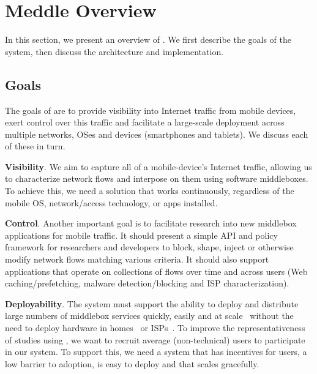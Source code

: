 \section{Meddle Overview}
\label{sec:goals}

In this section, we present an overview of \meddle. We first describe the goals of the 
system, then discuss the \meddle architecture and implementation. 


\subsection{Goals}

The goals of \meddle are to provide visibility into Internet traffic from mobile devices, 
exert control over this traffic and facilitate a large-scale deployment across multiple 
networks, OSes and devices (smartphones and tablets). We discuss each of these in turn.

\noindent\textbf{Visibility}. We aim to capture all of a mobile-device's Internet traffic,
allowing us to characterize network flows and interpose on them using software middleboxes. 
To achieve this, we need a solution that works continuously, regardless of the mobile OS, network/access 
technology, or apps installed. %
  
\noindent\textbf{Control}. Another important goal is to facilitate research into new middlebox 
applications for mobile traffic. 
It should present a simple API and policy framework for researchers and developers to block, shape, 
inject or otherwise modify network flows matching various criteria. It should also support applications that operate on collections of flows over 
time and across users (\eg Web caching/prefetching, malware detection/blocking and ISP characterization). 


\noindent\textbf{Deployability}. The system must support the ability to deploy and distribute large numbers 
of middlebox services quickly, easily and at scale~\cite{sherry:middleboxes} without 
the need to deploy hardware in homes~\cite{bismark} or ISPs~\cite{wang:middleboxes}. 
To improve the representativeness of studies using \meddle, we want to 
recruit average (\ie non-technical) users to participate in our system. To support this, we need a system 
that has incentives for users, a low barrier to adoption, is easy to deploy and that scales gracefully. 


